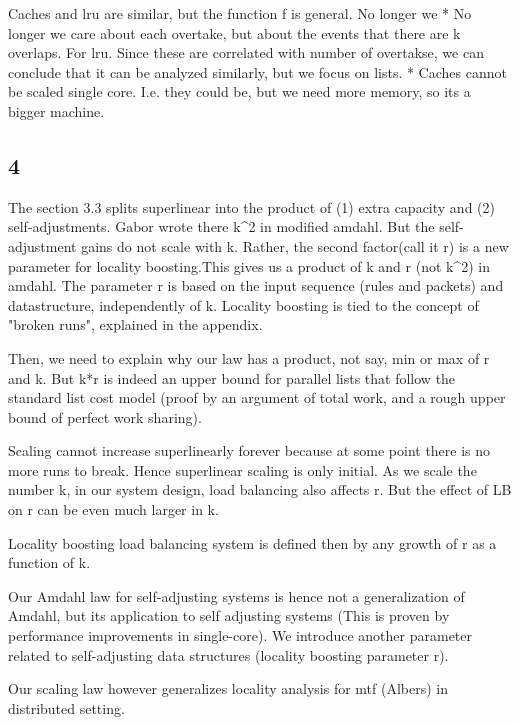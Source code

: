 Caches and lru are similar, but the function f is general. No longer we
* No longer we care about each overtake, but about the events that there are k overlaps. For lru. Since these are correlated with number of overtakse, we can conclude that it can be analyzed similarly, but we focus on lists.
* Caches cannot be scaled single core. I.e. they could be, but we need more memory, so its a bigger machine.

\subsection{4}



The section 3.3 splits superlinear into the product  of (1) extra  capacity and (2) self-adjustments. Gabor wrote there k^2 in modified amdahl. But the self-adjustment gains do not scale with k. Rather, the second factor(call it r) is a new parameter for locality boosting.This gives us a product of k and r (not k^2) in amdahl. The parameter  r is based on the input sequence (rules and packets) and datastructure, independently of k. Locality boosting is tied to the concept of "broken runs", explained in the appendix.

Then, we need to explain why our law has a product, not say, min or max of r and k. But k*r is indeed an upper bound for parallel lists that follow the standard list cost model  (proof by an argument of total work, and a rough upper bound of perfect work sharing).

Scaling cannot increase superlinearly forever because at some point there is no more runs to break. Hence superlinear scaling is only initial. As we scale the number k, in our system design, load balancing also affects r. But the effect of LB on r can be even much larger in k.

Locality boosting load balancing system is defined then by any growth of r as a function of k.



Our Amdahl law for self-adjusting systems is hence not a generalization of Amdahl, but its application to self adjusting systems (This is proven by performance improvements in single-core). We introduce another parameter related to self-adjusting  data structures (locality boosting parameter r).










Our scaling law however generalizes locality analysis for mtf (Albers) in distributed setting.

